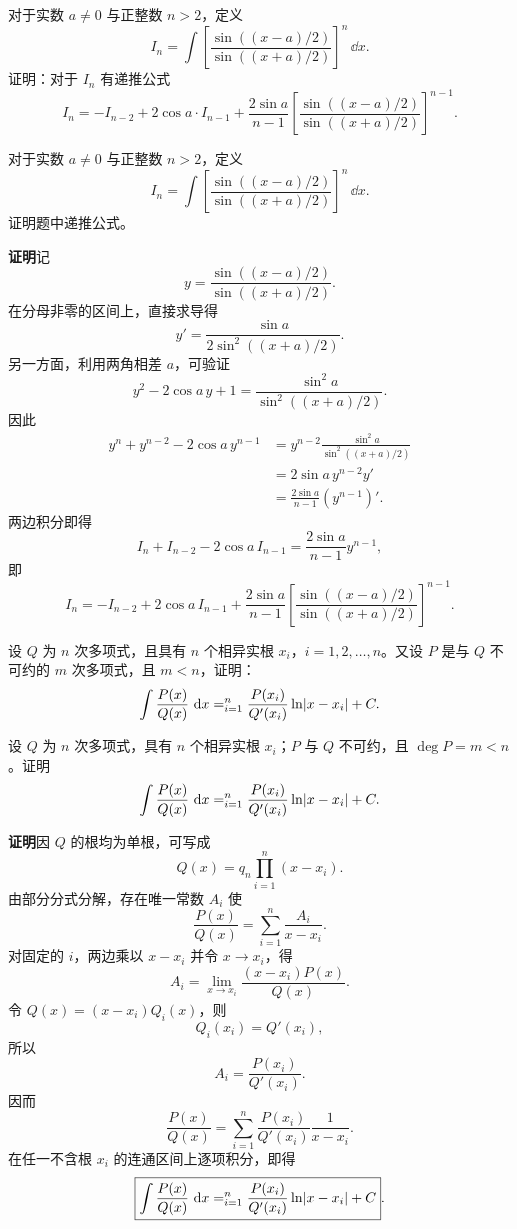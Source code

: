\begin{xreferenceproblem}[4]
对于实数 $a\ne0$ 与正整数 $n>2$，定义
  \[
    I_n=\int\left[\frac{\sin((x-a)/2)}{\sin((x+a)/2)}\right]^n\,\dd x.
  \]
  证明：对于 $I_n$ 有递推公式
  \[
    I_n=-I_{n-2}+2\cos a\cdot I_{n-1}
      +\frac{2\sin a}{n-1}
      \left[\frac{\sin((x-a)/2)}{\sin((x+a)/2)}\right]^{n-1}.
  \]
\end{xreferenceproblem}
\begin{xsolution}
对于实数 $a\ne0$ 与正整数 $n>2$，定义
  \[
    I_n=\int\left[
      \frac{\sin((x-a)/2)}{\sin((x+a)/2)}
    \right]^n\,\dd x.
  \]
  证明题中递推公式。

  \textbf{证明}\quad 记
  \[
    y=\frac{\sin((x-a)/2)}{\sin((x+a)/2)}.
  \]
  在分母非零的区间上，直接求导得
  \[
    y'=\frac{\sin a}{2\sin^2((x+a)/2)}.
  \]
  另一方面，利用两角相差 $a$，可验证
  \[
    y^2-2\cos a\,y+1
    =\frac{\sin^2a}{\sin^2((x+a)/2)}.
  \]
  因此
  \begin{align*}
    y^n+y^{n-2}-2\cos a\,y^{n-1}
    &=y^{n-2}\frac{\sin^2a}{\sin^2((x+a)/2)}\\
    &=2\sin a\,y^{n-2}y'\\
    &=\frac{2\sin a}{n-1}(y^{n-1})'.
  \end{align*}
  两边积分即得
  \[
    I_n+I_{n-2}-2\cos a\,I_{n-1}
    =\frac{2\sin a}{n-1}y^{n-1},
  \]
  即
  \[
    \boxed{
    I_n=-I_{n-2}+2\cos a\,I_{n-1}
    +\frac{2\sin a}{n-1}
    \left[
      \frac{\sin((x-a)/2)}{\sin((x+a)/2)}
    \right]^{n-1}}.
  \]
\end{xsolution}


\begin{xreferenceproblem}[5]
设 $Q$ 为 $n$ 次多项式，且具有 $n$ 个相异实根 $x_i$，$i=1,2,\ldots,n$。又设 $P$ 是与 $Q$ 不可约的 $m$ 次多项式，且 $m<n$，证明：
  \[
    \int\frac{P(x)}{Q(x)}\,\mathop{}\!\mathrm{d} x
    =\relax_{i=1}^n\frac{P(x_i)}{Q'(x_i)}\ln\lvert x-x_i\rvert+C.
  \]
\end{xreferenceproblem}
\begin{xsolution}
设 $Q$ 为 $n$ 次多项式，具有 $n$ 个相异实根 $x_i$；$P$ 与 $Q$ 不可约，且 $\deg P=m<n$。证明
  \[
    \int\frac{P(x)}{Q(x)}\,\mathop{}\!\mathrm{d} x
    =\relax_{i=1}^n\frac{P(x_i)}{Q'(x_i)}\ln\lvert x-x_i\rvert+C.
  \]

  \textbf{证明}\quad 因 $Q$ 的根均为单根，可写成
  \[
    Q(x)=q_n\prod_{i=1}^n(x-x_i).
  \]
  由部分分式分解，存在唯一常数 $A_i$ 使
  \[
    \frac{P(x)}{Q(x)}=\sum_{i=1}^n\frac{A_i}{x-x_i}.
  \]
  对固定的 $i$，两边乘以 $x-x_i$ 并令 $x\to x_i$，得
  \[
    A_i=\lim_{x\to x_i}\frac{(x-x_i)P(x)}{Q(x)}.
  \]
  令 $Q(x)=(x-x_i)Q_i(x)$，则
  \[
    Q_i(x_i)=Q'(x_i),
  \]
  所以
  \[
    A_i=\frac{P(x_i)}{Q'(x_i)}.
  \]
  因而
  \[
    \frac{P(x)}{Q(x)}
    =\sum_{i=1}^n\frac{P(x_i)}{Q'(x_i)}\frac1{x-x_i}.
  \]
  在任一不含根 $x_i$ 的连通区间上逐项积分，即得
  \[
    \boxed{
    \int\frac{P(x)}{Q(x)}\,\mathop{}\!\mathrm{d} x
    =\relax_{i=1}^n\frac{P(x_i)}{Q'(x_i)}\ln\lvert x-x_i\rvert+C}.
  \]
\end{xsolution}


